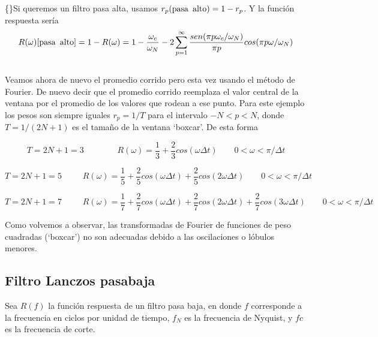 \documentclass[
]{agujournal2019}
\begin{document}
\{\noindent\}Si queremos un filtro pasa alta, usamos
\(r_p({\rm pasa}\,\,\,{\rm alto})=1-r_p\). Y la función respuesta sería
\[R(\omega)[{\rm pasa}\,\,\,{\rm alto}]=1-R(\omega)=1-\frac{\omega_c}{\omega_N} - 2\sum\limits^{\infty}_{p=1}
\frac{sen(\pi p \omega_c / \omega_N)}{\pi p}cos(\pi p \omega / \omega_N)\]\\
Veamos ahora de nuevo el promedio corrido pero esta vez usando el método
de Fourier. De nuevo decir que el promedio corrido reemplaza el valor
central de la ventana por el promedio de los valores que rodean a ese
punto. Para este ejemplo los pesos son siempre iguales \(r_p=1/T\) para
el intervalo \(-N<p<N\), donde \(T=1/(2N+1)\) es el tamaño de la ventana
`boxcar'. De esta forma ~

\[T=2N+1=3\,\,\,\,\,\,\,\,\,\,\,\,\,\,\,\,\,\,\,\,\,\,\,\,
R(\omega)=\frac{1}{3} + \frac{2}{3}cos(\omega \Delta t)
\,\,\,\,\,\,\,\,\,\,\,\,0<\omega<\pi/\Delta t\]

\[T=2N+1=5\,\,\,\,\,\,\,\,\,\,\,\,\,\,\,
R(\omega)=\frac{1}{5} + \frac{2}{5}cos(\omega \Delta t)+ \frac{2}{5}cos(2\omega \Delta t)
\,\,\,\,\,\,\,\,\,\,\,\,0<\omega<\pi/\Delta t\]

\[T=2N+1=7\,\,\,\,\,\,\,\,\,\,\,\,\,\,\,
R(\omega)=\frac{1}{7} + \frac{2}{7}cos(\omega \Delta t)+ \frac{2}{7}cos(2\omega \Delta t)+ \frac{2}{7}cos(3\omega \Delta t)
\,\,\,\,\,\,\,\,\,\,\,\,0<\omega<\pi/\Delta t\]

\begin{center}
\end{center}

Como volvemos a observar, las transformadas de Fourier de funciones de
peso cuadradas (`boxcar') no son adecuadas debido a las oscilaciones o
lóbulos menores.

\hypertarget{filtro-lanczos-pasabaja}{%
\subsection{Filtro Lanczos pasabaja}\label{filtro-lanczos-pasabaja}}

Sea \(R(f)\) la función respuesta de un filtro pasa baja, en donde \(f\)
corresponde a la frecuencia en ciclos por unidad de tiempo, \(f_N\) es
la frecuencia de Nyquist, y \(fc\) es la frecuencia de corte.

\begin{center}
\end{center}
\end{document}
